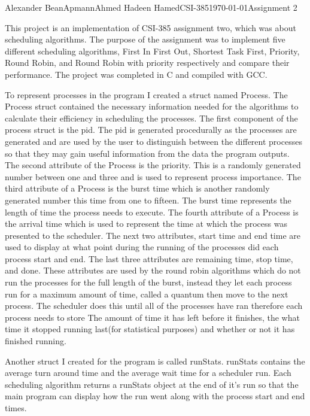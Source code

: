 \documentclass[12pt,letterpaper]{article}
\begin{document}
\begin{mla}{Alexander Bean}{Apmann}{Ahmed Hadeen Hamed}{CSI-385}{\today}{Assignment 2}

This project is an implementation of CSI-385 assignment two, which was about scheduling algorithms. The purpose of the assignment was to implement five different scheduling algorithms, First In First Out, Shortest Task First, Priority, Round Robin, and Round Robin with priority respectively and compare their performance. The project was completed in C and compiled with GCC.

To represent processes in the program I created a struct named Process. The Process struct contained the necessary information needed for the algorithms to calculate their efficiency in scheduling the processes. The first component of the process struct is the pid. The pid is generated procedurally as the processes are generated and are used by the user to distinguish between the different processes so that they may gain useful information from the data the program outputs. The second attribute of the Process is the priority. This is a randomly generated number between one and three and is used to represent process importance. The third attribute of a Process is the burst time which is another randomly generated number this time from one to fifteen. The burst time represents the length of time the process needs to execute. The fourth attribute of a Process is the arrival time which is used to represent the time at which the process was presented to the scheduler. The next two attributes, start time and end time are used to display at what point during the running of the processes did each process start and end. The last three attributes are remaining time, stop time, and done. These attributes are used by the round robin algorithms which do not run the processes for the full length of the burst, instead they let each process run for a maximum amount of time, called a quantum then move to the next process. The scheduler does this until all of the processes have ran therefore each process needs to store The amount of time it has left before it finishes, the what time it stopped running last(for statistical purposes) and whether or not it has finished running.

Another struct I created for the program is called runStats. runStats contains the average turn around time and the average wait time for a scheduler run. Each scheduling algorithm returns a runStats object at the end of it's run so that the main program can display how the run went along with the process start and end times.


\end{mla}
\end{document}
